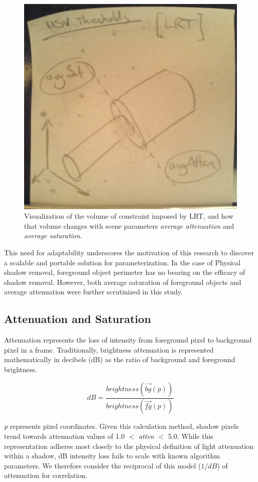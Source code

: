 \documentclass[12pt]{report}
\begin{document}
\begin{figure}
  \centering
  \includegraphics[width=.7\linewidth]{figures/mockup_cone_lrt.jpg}
  \caption{Visualization of the volume of constraint imposed by LRT, and how that volume changes with scene parameters \textit{average attenuation} and \textit{average saturation}.}
  \label{fig:cone_lrt}
\end{figure}

This need for adaptability underscores the motivation of this research to discover a scalable and portable solution for parameterization. In the case of Physical shadow removal, foreground object perimeter has no bearing on the efficacy of shadow removal. However, both average saturation of foreground objects and average attenuation were further scrutinized in this study.

\subsection{Attenuation and Saturation}

Attenuation represents the loss of intensity from foreground pixel to background pixel in a frame. Traditionally, brightness attenuation is represented mathematically in decibels (dB) as the ratio of background and foreground brightness.

\begin{equation}
dB = \dfrac{brightness(\vec{bg}(p))}{brightness(\vec{fg}(p))}
\end{equation}

\textit{p} represents pixel coordinates. Given this calculation method, shadow pixels trend towards attenuation values of 1.0 $<$ \textit{atten} $<$ 5.0. While this representation adheres most closely to the physical definition of light attenuation within a shadow, dB intensity loss fails to scale with known algorithm parameters. We therefore consider the reciprocal of this model ($1/dB$) of attenuation for correlation.
\end{document}
